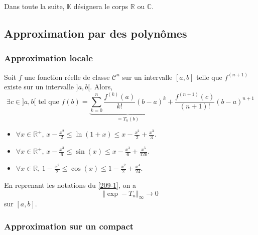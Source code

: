 




	Dans toute la suite, $\mathbb{K}$ désignera le corps $\mathbb{R}$ ou $\mathbb{C}$.

	\subsection{Approximation par des polynômes}

	\subsubsection{Approximation locale}


	\begin{theorem}
		\label{209-1}
		Soit $f$ une fonction réelle de classe $\mathcal{C}^n$ sur un intervalle $[a,b]$ telle que $f^{(n+1)}$ existe sur un intervalle $]a,b[$. Alors,
		\[ \exists c \in ]a,b[ \text{ tel que } f(b) = \underbrace{\sum_{k=0}^{n} \frac{f^{(k)} (a)}{k!} (b-a)^k}_{= T_n(b)} + \frac{f^{(n+1)}(c)}{(n+1)!} (b-a)^{n+1} \]
	\end{theorem}

	\begin{application}
		\begin{itemize}
			\item $\forall x \in \mathbb{R}^+, \, x - \frac{x^2}{2} \leq \ln(1+x) \leq x - \frac{x^2}{2} + \frac{x^3}{3}$.
			\item $\forall x \in \mathbb{R}^+, \, x - \frac{x^3}{6} \leq \sin(x) \leq x - \frac{x^3}{6} + \frac{x^5}{120}$.
			\item $\forall x \in \mathbb{R}, \, 1 - \frac{x^2}{2} \leq \cos(x) \leq 1 - \frac{x^2}{2} + \frac{x^4}{24}$.
		\end{itemize}
	\end{application}

	\begin{proposition}
		En reprenant les notations du \cref{209-1}, on a
		\[ \Vert \exp - T_n \Vert_\infty \longrightarrow 0 \]
		sur $[a,b]$.
	\end{proposition}

	\subsubsection{Approximation sur un compact}

